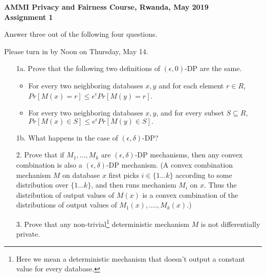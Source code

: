 \documentclass{article}
\begin{document}
\begin{center}

{\bf AMMI Privacy and Fairness Course, Rwanda, May 2019}\\

{\bf Assignment 1}\\

\end{center}

Answer three out of the following four questions.

Please turn in by Noon on Thursday, May 14.

\begin{itemize}

\item[1a.] Prove that 
the following two definitions of $(\epsilon,0)$-DP are the same.

\begin{itemize}

\item For every two neighboring databases $x,y$ and
for each element $r \in R$,
$Pr[M(x)=r] \leq e^{\epsilon} Pr[M(y)=r] $.


\item For every two neighboring databases $x,y$, and for every
subset $S \subseteq R$, $Pr[M(x) \in S] \leq e^{\epsilon} Pr[M(y)\in S] .$

\end{itemize}

\item[1b.] What happens in the case of $(\epsilon,\delta)$-DP?

\item[2.] Prove that if $M_1,...,M_k$ are $(\epsilon,\delta)$-DP mechanisms,
then any convex combination is also a $(\epsilon,\delta)$-DP mechanism.
        (A convex combination mechanism $M$ on database $x$ first picks $i \in \{1\ldots k\}$
according to some distribution over $\{1\ldots k\}$, and then runs
mechanism $M_i$ on $x$. Thus the distribution of output values of
$M(x)$ is a convex combination of the distributions of output values
        of $M_1(x),....,M_k(x)$.)


    \item[3.] Prove that any non-trivial\footnote{
            Here we mean a deterministic mechanism that doesn't output a
            constant value for every database.
        } deterministic mechanism $M$ is not differentially private.


\end{itemize}
\end{document}
